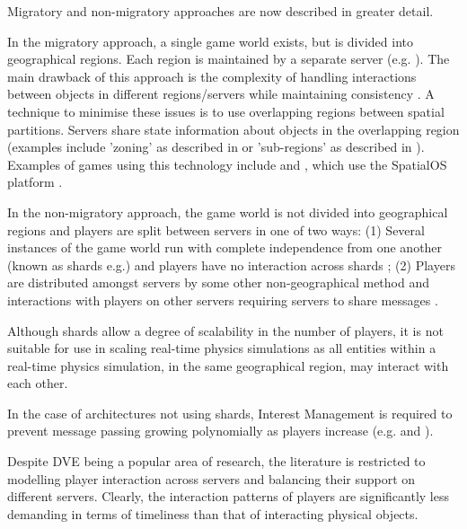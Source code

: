 Migratory and non-migratory approaches are now described in greater detail.

In the migratory approach, a single game world exists, but is divided into geographical regions. Each region is maintained by a separate server (e.g. \cite{AnOverlappingArchitecture, ScalabilityIssues, LoadBalancingForDistributedVR, ALoadBalancingAlgorithm, SpatialOS}). The main drawback of this approach is the complexity of handling interactions between objects in different regions/servers while maintaining consistency \cite{P2PForMMOs}. A technique to minimise these issues is to use overlapping regions between spatial partitions. Servers share state information about objects in the overlapping region (examples include 'zoning' as described in \cite{AnOverlappingArchitecture} or 'sub-regions' as described in \cite{ScalabilityIssues}). Examples of games using this technology include \cite{Vanishin30:online} and \cite{WorldsAd48:online}, which use the SpatialOS platform \cite{SpatialOS}. %
 
In the non-migratory approach, the game world is not divided into geographical regions and players are split between servers in one of two ways: (1) Several instances of the game world run with complete independence from one another (known as shards e.g.\cite{WOW}) and players have no interaction across shards \cite{P2PForMMOs}; (2) Players are distributed amongst servers by some other non-geographical method and interactions with players on other servers requiring servers to share messages \cite{LoadBalancingforMMOs}.

Although shards allow a degree of scalability in the number of players, it is not suitable for use in scaling real-time physics simulations as all entities within a real-time physics simulation, in the same geographical region, may interact with each other.

In the case of architectures not using shards, Interest Management is required to prevent message passing growing polynomially as players increase (e.g. \cite{Bezerra2008} and \cite{LoadBalancingforMMOs}).

Despite DVE being a popular area of research, the literature is restricted to modelling player interaction across servers and balancing their support on different servers. Clearly, the interaction patterns of players are significantly less demanding in terms of timeliness than that of interacting physical objects.


